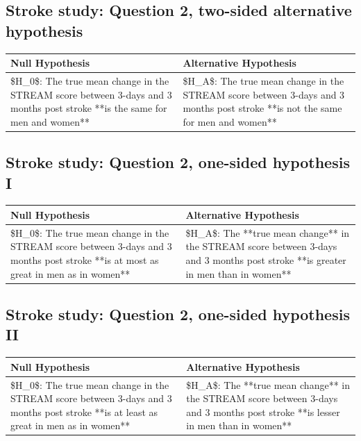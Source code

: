 \documentclass[
]{book}
\begin{document}
\hypertarget{stroke-study-question-2-two-sided-alternative-hypothesis}{%
\subsection{Stroke study: Question 2, two-sided alternative hypothesis}\label{stroke-study-question-2-two-sided-alternative-hypothesis}}

\begin{tabular}{l|l}
\hline
Null Hypothesis & Alternative Hypothesis\\
\hline
\$H\_0\$: The true mean change in the STREAM score between 3-days and 3 months post stroke **is the same for men and women** & \$H\_A\$: The true mean change in the STREAM score between 3-days and 3 months post stroke **is not the same for men and women**\\
\hline
\end{tabular}

\hypertarget{stroke-study-question-2-one-sided-hypothesis-i}{%
\subsection{Stroke study: Question 2, one-sided hypothesis I}\label{stroke-study-question-2-one-sided-hypothesis-i}}

\begin{tabular}{l|l}
\hline
Null Hypothesis & Alternative Hypothesis\\
\hline
\$H\_0\$: The true mean change in the STREAM score between 3-days and 3 months post stroke **is at most as great in men as in women** & \$H\_A\$: The **true mean change** in the STREAM score between 3-days and 3 months post stroke **is greater in men than in women**\\
\hline
\end{tabular}

\hypertarget{stroke-study-question-2-one-sided-hypothesis-ii}{%
\subsection{Stroke study: Question 2, one-sided hypothesis II}\label{stroke-study-question-2-one-sided-hypothesis-ii}}

\begin{tabular}{l|l}
\hline
Null Hypothesis & Alternative Hypothesis\\
\hline
\$H\_0\$: The true mean change in the STREAM score between 3-days and 3 months post stroke **is at least as great in men as in women** & \$H\_A\$: The **true mean change** in the STREAM score between 3-days and 3 months post stroke **is lesser in men than in women**\\
\hline
\end{tabular}
\end{document}
